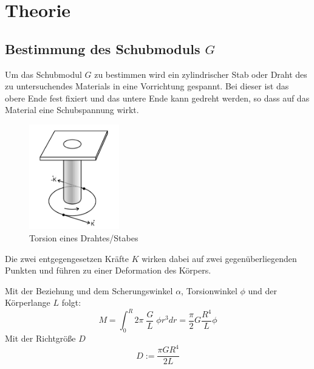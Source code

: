 \newpage
\section{Theorie}
\label{sec:theorie}

\subsection{Bestimmung des Schubmoduls $G$}
Um das Schubmodul $G$ zu bestimmen wird ein zylindrischer Stab oder Draht des zu untersuchendes
Materials in eine Vorrichtung gespannt. Bei dieser ist das obere Ende fest fixiert und das untere
Ende kann gedreht werden, so dass auf das Material eine Schubspannung wirkt.

\begin{figure}[h]
    \centering
    \includegraphics[width=0.35\textwidth, height=0.4\textwidth]{bilder/Torsion_allgemein.jpeg}
    \caption{Torsion eines Drahtes/Stabes}        
    \label{fig:torsion_allgemein}
\end{figure} 

Die zwei entgegengesetzen Kräfte $K$ wirken dabei auf zwei gegenüberliegenden Punkten 
und führen zu einer Deformation des Körpers.

Mit der Beziehung  %
und dem Scherungswinkel $\alpha$, Torsionwinkel $\phi$ 
und der Körperlange $L$ folgt:
\begin{equation}
    M = \int_{0}^{R} 2\pi\;\frac{G}{L}\;\phi r^3 dr = \frac{\pi}{2}G\frac{R^4}{L}\phi
\end{equation}
Mit der Richtgröße $D$
\begin{equation}
    D:=\frac{\pi G R^4}{2L}
    \label{eqn:richtgroesse}
\end{equation}

